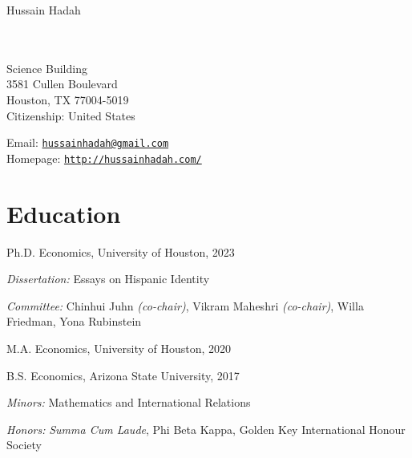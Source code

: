 \documentclass[10pt,letterpaper]{article}
\newcommand{\MYhref}[3][black]{\href{#2}{\color{#1}{#3}}}%
\def\name{Hussain Hadah}
\renewenvironment{itemize}{
  \begin{list}{}{
    \setlength{\leftmargin}{1.5em}
  }
}{
  \end{list}
}
\begin{document}
{\Huge \name}


\vspace{0.25in}

\begin{minipage}[t]{0.5\textwidth}
  \MYhref{https://www.uh.edu/}{University of Houston} \\
  \MYhref{https://www.uh.edu/class/economics/}{Department of Economics} \\
  Science Building \\
  3581 Cullen Boulevard \\
  Houston, TX 77004-5019 \\
  Citizenship: United States
\end{minipage}
\begin{minipage}[t]{0.5\textwidth}
  Email: \href{mailto:hussainhadah@gmail.com}{\tt hussainhadah@gmail.com} \\
  Homepage: \href{http://hussainhadah.com/}{\tt http://hussainhadah.com/} \\
\end{minipage}

\section*{Education}

\begin{itemize}
  \item Ph.D. Economics, University of Houston, 2023
  \begin{itemize}
    \item \textit{Dissertation:} Essays on Hispanic Identity
    \item \textit{Committee:} Chinhui Juhn \textit{(co-chair)}, Vikram Maheshri \textit{(co-chair)}, Willa Friedman, Yona Rubinstein
  \end{itemize}

  \item M.A. Economics, University of Houston, 2020

  \item B.S. Economics, Arizona State University, 2017
    \begin{itemize}
    \item \textit{Minors:} Mathematics and International Relations
    \item \textit{Honors:} \textit{Summa Cum Laude}, Phi Beta Kappa, Golden 
    Key International Honour Society
    \end{itemize}

\end{itemize}
\end{document}
